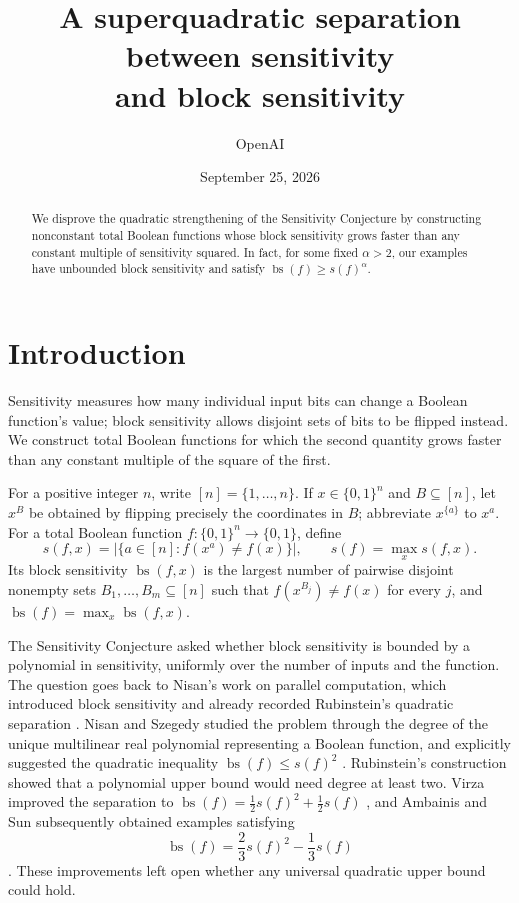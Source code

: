 \documentclass[11pt]{article}
\title{A superquadratic separation between sensitivity\\and block sensitivity}
\author{OpenAI}
\date{September 25, 2026}
\newcommand{\bs}{\operatorname{bs}}
\theoremstyle{definition}
\theoremstyle{remark}
\begin{document}
\maketitle
\begin{abstract}
We disprove the quadratic strengthening of the Sensitivity Conjecture by
constructing nonconstant total Boolean functions whose block sensitivity grows
faster than any constant multiple of sensitivity squared. In fact, for some
fixed \(\alpha>2\), our examples have unbounded block sensitivity and satisfy
\(\bs(f)\ge s(f)^\alpha\).
\end{abstract}
\section{Introduction}
\label{sec:introduction}

Sensitivity measures how many individual input bits can change a Boolean
function's value; block sensitivity allows disjoint sets of bits to be
flipped instead. We construct total Boolean functions for which the second
quantity grows faster than any constant multiple of the square of the first.

For a positive integer \(n\), write \([n]=\{1,\ldots,n\}\).
If \(x\in\{0,1\}^n\) and \(B\subseteq[n]\), let \(x^B\) be obtained
by flipping precisely the coordinates in \(B\); abbreviate
\(x^{\{a\}}\) to \(x^a\).
For a total Boolean function \(f:\{0,1\}^n\to\{0,1\}\), define
\[
 s(f,x)=\bigl|\{a\in[n]:f(x^a)\ne f(x)\}\bigr|,
 \qquad s(f)=\max_x s(f,x).
\]
Its block sensitivity \(\bs(f,x)\) is the largest number of pairwise
disjoint nonempty sets \(B_1,\ldots,B_m\subseteq[n]\) such that
\(f(x^{B_j})\ne f(x)\) for every \(j\), and
\(\bs(f)=\max_x\bs(f,x)\).

The Sensitivity Conjecture asked whether block sensitivity is bounded by a
polynomial in sensitivity, uniformly over the number of inputs and the
function. The question goes back to Nisan's work on parallel computation,
which introduced block sensitivity and already recorded Rubinstein's
quadratic separation \cite[Section~2]{Nisan1989}.
Nisan and Szegedy studied the problem through the degree of the unique
multilinear real polynomial representing a Boolean function, and explicitly
suggested the quadratic inequality \(\bs(f)\le s(f)^2\)
\cite[Section~4]{NisanSzegedy1994}.
Rubinstein's construction \cite{Rubinstein1995} showed that a polynomial
upper bound would need degree at least two. Virza improved the separation
to \(\bs(f)=\tfrac12s(f)^2+\tfrac12s(f)\) \cite{Virza2011}, and
Ambainis and Sun subsequently obtained examples satisfying
\[
 \bs(f)=\frac23s(f)^2-\frac13s(f)
\]
\cite[Theorem~1]{AmbainisSun2011}.
These improvements left open whether any universal quadratic upper bound
could hold.
\end{document}
